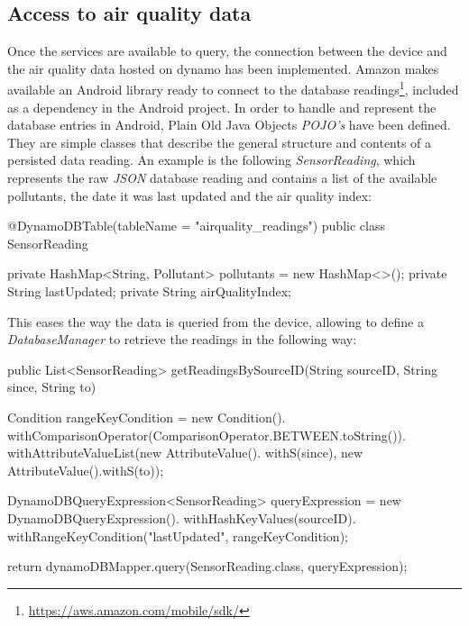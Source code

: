 \subsection{Access to air quality data}
Once the services are available to query, the connection between the device and the air quality data hosted on dynamo has been implemented. Amazon makes available an Android library ready to connect to the database readings\footnote{\url{https://aws.amazon.com/mobile/sdk/}}, included as a dependency in the Android project. In order to handle and represent the database entries in Android, Plain Old Java Objects \textit{POJO's} have been defined. They are simple classes that describe the general structure and contents of a persisted data reading. An example is the following \textit{SensorReading}, which represents the raw \textit{JSON} database reading  and contains a list of the available pollutants, the date it was last updated and the air quality index:

{\centering
\begin{spverbatim}

@DynamoDBTable(tableName = "airquality_readings")
public class SensorReading {

    private HashMap<String, Pollutant> pollutants = new HashMap<>();
    private String lastUpdated;
    private String airQualityIndex;
}
\end{spverbatim}
\par
}

This eases the way the data is queried from the device, allowing to define a \textit{DatabaseManager} to retrieve the readings in the following way: 

{\centering
\begin{spverbatim}
public List<SensorReading> getReadingsBySourceID(String sourceID, String since, String to) {

  Condition rangeKeyCondition = new Condition().
    withComparisonOperator(ComparisonOperator.BETWEEN.toString()).
    withAttributeValueList(new AttributeValue().
    withS(since), new AttributeValue().withS(to));

  DynamoDBQueryExpression<SensorReading> queryExpression = new
    DynamoDBQueryExpression().
    withHashKeyValues(sourceID).
    withRangeKeyCondition("lastUpdated", rangeKeyCondition);
  
return dynamoDBMapper.query(SensorReading.class, queryExpression);
}
\end{spverbatim}
\par
}

